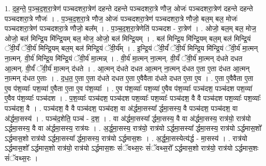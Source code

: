 \documentclass[17pt]{extarticle}
\begin{document}
1. द॒ह॒न्ते॒ प॒ञ्च॒द॒श॒रा॒त्रेण॑ पञ्चदशरा॒त्रेण॑ दहन्ते दहन्ते पञ्चदशरा॒त्रे णौज॒ ओजः॑ पञ्चदशरा॒त्रेण॑ दहन्ते दहन्ते पञ्चदशरा॒त्रे णौजः॑ । . प॒ञ्च॒द॒श॒रा॒त्रे णौज॒ ओजः॑ पञ्चदशरा॒त्रेण॑ पञ्चदशरा॒त्रे णौजो॒ बल॒म् बल॒ मोजः॑ पञ्चदशरा॒त्रेण॑ पञ्चदशरा॒त्रे णौजो॒ बल᳚म् । . प॒ञ्च॒द॒श॒रा॒त्रेणेति॑ पञ्चदश - रा॒त्रेण॑ । . ओजो॒ बल॒म् बल॒ मोज॒ ओजो॒ बल॑ मिन्द्रि॒य मि॑न्द्रि॒यम् बल॒ मोज॒ ओजो॒ बल॑ मिन्द्रि॒यम् । . बल॑ मिन्द्रि॒य मि॑न्द्रि॒यम् बल॒म् बल॑ मिन्द्रि॒यं ॅवी॒र्यं॑ ॅवी॒र्य॑ मिन्द्रि॒यम् बल॒म् बल॑ मिन्द्रि॒यं ॅवी॒र्य᳚म् । . इ॒न्द्रि॒यं ॅवी॒र्यं॑ ॅवी॒र्य॑ मिन्द्रि॒य मि॑न्द्रि॒यं ॅवी॒र्य॑ मा॒त्मन् ना॒त्मन्. वी॒र्य॑ मिन्द्रि॒य मि॑न्द्रि॒यं ॅवी॒र्य॑ मा॒त्मन्न् । . वी॒र्य॑ मा॒त्मन् ना॒त्मन्. वी॒र्यं॑ ॅवी॒र्य॑ मा॒त्मन् द॑धते दधत आ॒त्मन्. वी॒र्यं॑ ॅवी॒र्य॑ मा॒त्मन् द॑धते । . आ॒त्मन् द॑धते दधत आ॒त्मन् ना॒त्मन् द॑धत ए॒ता ए॒ता द॑धत आ॒त्मन् ना॒त्मन् द॑धत ए॒ताः । . द॒ध॒त॒ ए॒ता ए॒ता द॑धते दधत ए॒ता ए॒वैवैता द॑धते दधत ए॒ता ए॒व । . ए॒ता ए॒वैवैता ए॒ता ए॒व प॑श॒व्याः᳚ पश॒व्या॑ ए॒वैता ए॒ता ए॒व प॑श॒व्याः᳚ । . ए॒व प॑श॒व्याः᳚ पश॒व्या॑ ए॒वैव प॑श॒व्याः᳚ पञ्च॑दश॒ पञ्च॑दश पश॒व्या॑ ए॒वैव प॑श॒व्याः᳚ पञ्च॑दश । . प॒श॒व्याः᳚ पञ्च॑दश॒ पञ्च॑दश पश॒व्याः᳚ पश॒व्याः᳚ पञ्च॑दश॒ वै वै पञ्च॑दश पश॒व्याः᳚ पश॒व्याः᳚ पञ्च॑दश॒ वै । . पञ्च॑दश॒ वै वै पञ्च॑दश॒ पञ्च॑दश॒ वा अ॑र्द्धमा॒सस्या᳚ र्द्धमा॒सस्य॒ वै पञ्च॑दश॒ पञ्च॑दश॒ वा अ॑र्द्धमा॒सस्य॑ । . पञ्च॑द॒शेति॒ पञ्च॑ - द॒श॒ । . वा अ॑र्द्धमा॒सस्या᳚ र्द्धमा॒सस्य॒ वै वा अ॑र्द्धमा॒सस्य॒ रात्र॑यो॒ रात्र॑यो ऽर्द्धमा॒सस्य॒ वै वा अ॑र्द्धमा॒सस्य॒ रात्र॑यः । . अ॒र्द्ध॒मा॒सस्य॒ रात्र॑यो॒ रात्र॑यो ऽर्द्धमा॒सस्या᳚ र्द्धमा॒सस्य॒ रात्र॑यो ऽर्द्धमास॒शो᳚ ऽर्द्धमास॒शो रात्र॑यो ऽर्द्धमा॒सस्या᳚ र्द्धमा॒सस्य॒ रात्र॑यो ऽर्द्धमास॒शः । . अ॒र्द्ध॒मा॒सस्येत्य॑र्द्ध - मा॒सस्य॑ । . रात्र॑यो ऽर्द्धमास॒शो᳚ ऽर्द्धमास॒शो रात्र॑यो॒ रात्र॑यो ऽर्द्धमास॒शः सं॑ॅवथ्स॒रः सं॑ॅवथ्स॒रो᳚ ऽर्द्धमास॒शो रात्र॑यो॒ रात्र॑यो ऽर्द्धमास॒शः सं॑ॅवथ्स॒रः । \newline
\end{document}
